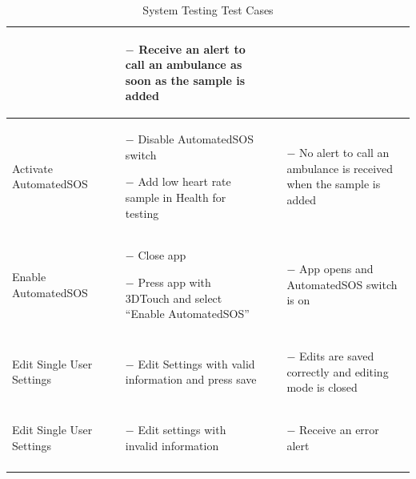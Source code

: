 \documentclass[titlepage]{article}
\begin{document}
\begin{longtable}{| p{3 cm} | p{4 cm} | p{4 cm} |}
\begin{itemize}[nolistsep]
		\end{itemize}
		& \begin{itemize}[nolistsep]
			\item[$-$] Receive an alert to call an ambulance as soon as the sample is added
		\end{itemize} \\ \hline
		Activate AutomatedSOS & \begin{itemize}[nolistsep]
			\item[$-$] Disable AutomatedSOS switch
			\item[$-$] Add low heart rate sample in Health for testing
		\end{itemize}
		& \begin{itemize}[nolistsep]
			\item[$-$] No alert to call an ambulance is received when the sample is added
		\end{itemize} \\ \hline
		Enable AutomatedSOS & \begin{itemize}[nolistsep]
			\item[$-$] Close app
			\item[$-$] Press app with 3DTouch and select “Enable AutomatedSOS”
		\end{itemize}
		& \begin{itemize}[nolistsep]
			\item[$-$] App opens and AutomatedSOS switch is on
		\end{itemize} \\ \hline
		Edit Single User Settings & \begin{itemize}[nolistsep]
			\item[$-$] Edit Settings with valid information and press save
		\end{itemize}
		& \begin{itemize}[nolistsep]
			\item[$-$] Edits are saved correctly and editing mode is closed
		\end{itemize} \\ \hline
		Edit Single User Settings & \begin{itemize}[nolistsep]
			\item[$-$] Edit settings with invalid information
		\end{itemize}
		& \begin{itemize}[nolistsep]
			\item[$-$] Receive an error alert
		\end{itemize} \\ \hline
		\caption{System Testing Test Cases}
	\end{longtable}
	
\end{document}

